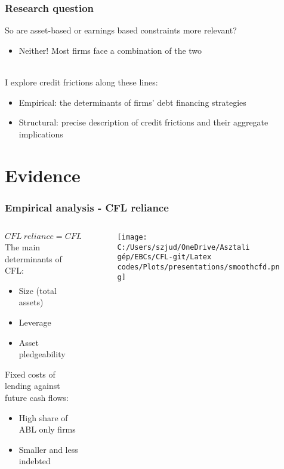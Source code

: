 \documentclass[notes]{beamer}
\begin{document}
\begin{frame}
  \frametitle{Research question}
  
So are asset-based or earnings based constraints more relevant? 
\begin{itemize}
    \item Neither! Most firms face a combination of the two
\end{itemize} \vspace{5mm} \\
I explore credit frictions along these lines: 
\begin{itemize}
 \setlength\itemsep{0em}
    \item Empirical: the determinants of firms' debt financing strategies
    \item Structural: precise description of credit frictions and their aggregate implications
\end{itemize}
  

\end{frame}
\section{Evidence}

\begin{frame}
  \frametitle{Empirical analysis - CFL reliance}

  \begin{columns}
    \begin{column}{0.55\textwidth} %
    
    $ CFL \ reliance = CFL \ debt / Total \  debt $ \vspace{1mm} \\

    The main determinants of CFL: 
    \begin{itemize}
     \setlength\itemsep{0em}
        \item Size (total assets)
        \item Leverage
        \item Asset pledgeability
    \end{itemize}
    Fixed costs of lending against future cash flows: 
    \begin{itemize}
        \setlength\itemsep{0em}
        \item High share of ABL only firms
        \item Smaller and less indebted
    \end{itemize}
    
 \end{column}
 \begin{column}{0.45\textwidth} %
     \begin{figure}
        \texttt{[image: C:/Users/szjud/OneDrive/Asztali gép/EBCs/CFL-git/Latex codes/Plots/presentations/smoothcfd.png]} %
      \end{figure}
    \end{column}
  \end{columns}
\end{frame}
\end{document}
